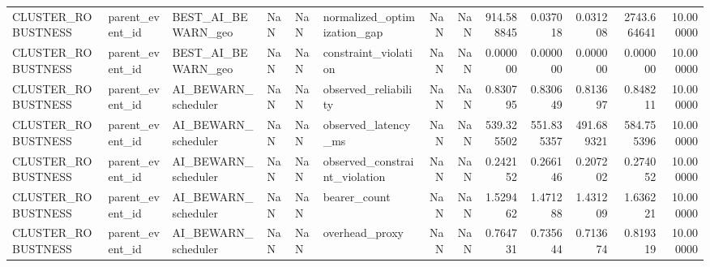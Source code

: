 \begin{tabular}{llllllrrrrrrr}
CLUSTER\_ROBUSTNESS & parent\_event\_id & BEST\_AI\_BEWARN\_geo & NaN & NaN & normalized\_optimization\_gap & NaN & NaN & 914.588845 & 0.037018 & 0.031208 & 2743.664641 & 10.000000 \\
CLUSTER\_ROBUSTNESS & parent\_event\_id & BEST\_AI\_BEWARN\_geo & NaN & NaN & constraint\_violation & NaN & NaN & 0.000000 & 0.000000 & 0.000000 & 0.000000 & 10.000000 \\
CLUSTER\_ROBUSTNESS & parent\_event\_id & AI\_BEWARN\_scheduler & NaN & NaN & observed\_reliability & NaN & NaN & 0.830795 & 0.830649 & 0.813697 & 0.848211 & 10.000000 \\
CLUSTER\_ROBUSTNESS & parent\_event\_id & AI\_BEWARN\_scheduler & NaN & NaN & observed\_latency\_ms & NaN & NaN & 539.325502 & 551.835357 & 491.689321 & 584.755396 & 10.000000 \\
CLUSTER\_ROBUSTNESS & parent\_event\_id & AI\_BEWARN\_scheduler & NaN & NaN & observed\_constraint\_violation & NaN & NaN & 0.242152 & 0.266146 & 0.207202 & 0.274052 & 10.000000 \\
CLUSTER\_ROBUSTNESS & parent\_event\_id & AI\_BEWARN\_scheduler & NaN & NaN & bearer\_count & NaN & NaN & 1.529462 & 1.471288 & 1.431209 & 1.636221 & 10.000000 \\
CLUSTER\_ROBUSTNESS & parent\_event\_id & AI\_BEWARN\_scheduler & NaN & NaN & overhead\_proxy & NaN & NaN & 0.764731 & 0.735644 & 0.713674 & 0.819319 & 10.000000 \\
\bottomrule
\end{tabular}
